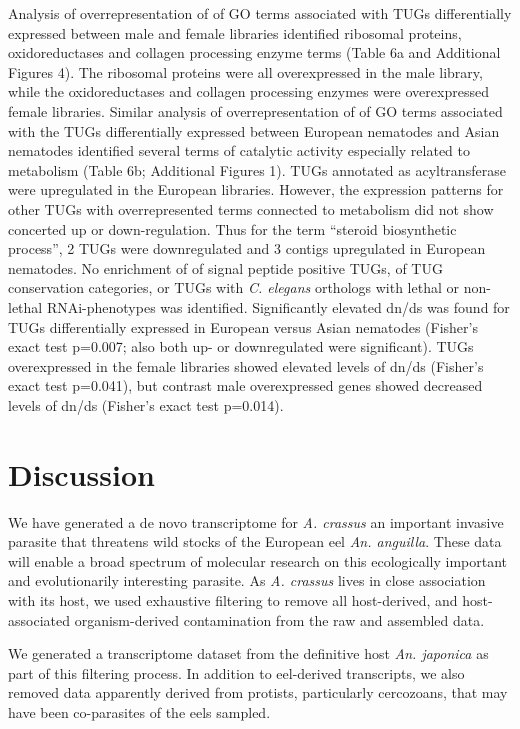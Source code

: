 \documentclass[10pt]{bmc_article}
\newenvironment{bmcformat}{\begin{raggedright}\baselineskip20pt\sloppy\setboolean{publ}{false}}{\end{raggedright}\baselineskip20pt\sloppy}
\begin{document}
\begin{bmcformat}
Analysis of overrepresentation of of GO terms associated with TUGs
differentially expressed between male and female libraries identified
ribosomal proteins, oxidoreductases and collagen processing enzyme
terms (Table 6a and Additional Figures 4). The ribosomal proteins were
all overexpressed in the male library, while the oxidoreductases and
collagen processing enzymes were overexpressed female
libraries. Similar analysis of overrepresentation of of GO terms
associated with the TUGs differentially expressed between European
nematodes and Asian nematodes identified several terms of catalytic
activity especially related to metabolism (Table 6b; Additional
Figures 1). TUGs annotated as acyltransferase were upregulated in the
European libraries. However, the expression patterns for other TUGs
with overrepresented terms connected to metabolism did not show
concerted up or down-regulation. Thus for the term ``steroid
biosynthetic process'', 2 TUGs were downregulated and 3 contigs
upregulated in European nematodes. No enrichment of of signal peptide
positive TUGs, of TUG conservation categories, or TUGs with
\textit{C. elegans} orthologs with lethal or non-lethal
RNAi-phenotypes was identified. Significantly elevated dn/ds was found
for TUGs differentially expressed in European versus Asian nematodes
(Fisher's exact test p=0.007; also both up- or downregulated were
significant). TUGs overexpressed in the female libraries showed
elevated levels of dn/ds (Fisher's exact test p=0.041), but contrast
male overexpressed genes showed decreased levels of dn/ds (Fisher's
exact test p=0.014).


\section*{Discussion}

We have generated a de novo transcriptome for \textit{A. crassus} an
important invasive parasite that threatens wild stocks of the European
eel \textit{An. anguilla}. These data will enable a broad spectrum of
molecular research on this ecologically important and evolutionarily
interesting parasite. As \textit{A. crassus} lives in close
association with its host, we used exhaustive filtering to remove all
host-derived, and host-associated organism-derived contamination from
the raw and assembled data.

We generated a transcriptome dataset from the definitive host
\textit{An. japonica} as part of this filtering process. In addition
to eel-derived transcripts, we also removed data apparently derived
from protists, particularly cercozoans, that may have been
co-parasites of the eels sampled.


\end{bmcformat}
\end{document}
